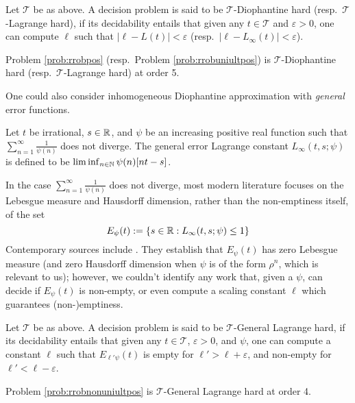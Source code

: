 \begin{definition}
\label{def:hardness}
Let $\mathcal{T}$ be as above. A decision problem is said to be $\mathcal{T}$-Diophantine hard (resp.\ $\mathcal{T}$-Lagrange hard), if its decidability entails that given any $t \in \mathcal{T}$ and $\varepsilon > 0$, one can compute $\ell$ such that $|\ell - L(t)| < \varepsilon$ (resp.\  $|\ell - L_\infty(t)| < \varepsilon$).
\end{definition}

\begin{theorem}
\label{thm:hardness}
Problem \ref{prob:rrobpos} (resp.\ Problem \ref{prob:rrobuniultpos}) is $\mathcal{T}$-Diophantine hard (resp.\ $\mathcal{T}$-Lagrange hard) at order 5. 
\end{theorem}

One could also consider inhomogeneous Diophantine approximation with \textit{general} error functions.
\begin{definition}
\label{def:generallagrange}
Let $t$ be irrational, $s\in \mathbb{R}$, and $\psi$ be an increasing positive real function such that $\sum_{n=1}^\infty \frac{1}{\psi(n)}$ does not diverge. The general error Lagrange constant $L_\infty(t, s; \psi)$ is defined to be $\liminf_{n\in \mathbb{N}}\psi(n)[nt - s]$.
\end{definition}

In the case $\sum_{n=1}^\infty \frac{1}{\psi(n)}$ does not diverge, most modern literature focuses on the Lebesgue measure and Hausdorff dimension, rather than the non-emptiness itself, of the set 
$$
E_\psi(t) := \{s\in \mathbb{R}: L_\infty(t, s; \psi) \le 1\}
$$ 
Contemporary sources include \cite{generaldio1,generaldio2,generaldio3,generaldio4}. They establish that $E_\psi(t)$ has zero Lebesgue measure (and zero Hausdorff dimension when $\psi$ is of the form $\rho^n$, which is relevant to us); however, we couldn't identify any work that, given a $\psi$, can decide if $E_{\psi}(t)$ is non-empty, or even compute a scaling constant $\ell$ which guarantees (non-)emptiness.

\begin{definition}
\label{def:hardness2}
Let $\mathcal{T}$ be as above. A decision problem is said to be $\mathcal{T}$-General Lagrange hard, if its decidability entails that given any $t \in \mathcal{T}$, $\varepsilon > 0$, and $\psi$, one can compute a constant $\ell$ such that $E_{\ell'\psi}(t)$ is empty for $\ell' > \ell + \varepsilon$, and non-empty for $\ell' < \ell - \varepsilon$.
\end{definition}

\begin{theorem}
\label{thm:hardness2}
Problem \ref{prob:rrobnonuniultpos} is $\mathcal{T}$-General Lagrange hard at order 4. 
\end{theorem}